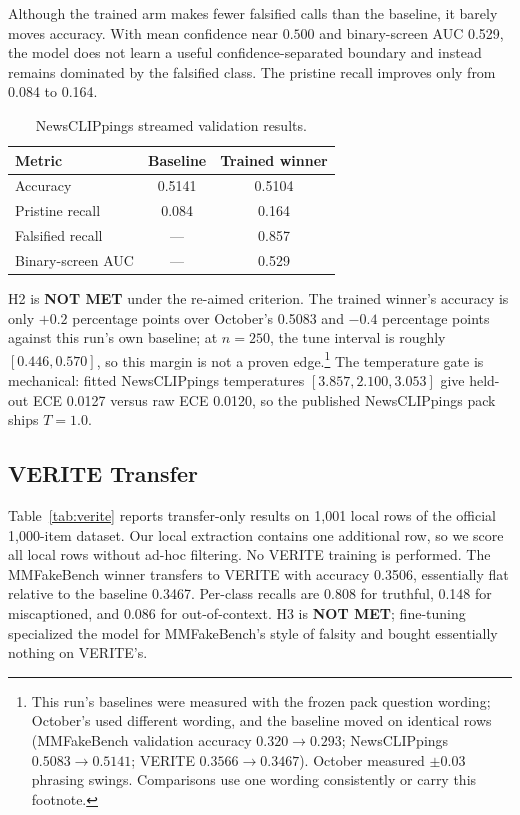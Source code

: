 \documentclass{article} %
\begin{document}
Although the trained arm makes fewer falsified calls than the baseline, it barely moves accuracy. With mean confidence near \(0.500\) and binary-screen AUC 0.529, the model does not learn a useful confidence-separated boundary and instead remains dominated by the falsified class. The pristine recall improves only from 0.084 to 0.164.

\begin{table}[t]
\centering
\small
\caption{NewsCLIPpings streamed validation results.}
\label{tab:ncp}
\begin{tabular}{lcc}
\toprule
Metric & Baseline & Trained winner \\
\midrule
Accuracy & 0.5141 & 0.5104 \\
Pristine recall & 0.084 & 0.164 \\
Falsified recall & --- & 0.857 \\
Binary-screen AUC & --- & 0.529 \\
\bottomrule
\end{tabular}
\end{table}

H2 is \textbf{NOT MET} under the re-aimed criterion. The trained winner's accuracy is only \(+0.2\) percentage points over October's 0.5083 and \(-0.4\) percentage points against this run's own baseline; at \(n=250\), the tune interval is roughly \([0.446, 0.570]\), so this margin is not a proven edge.\footnote{This run's baselines were measured with the frozen pack question wording; October's used different wording, and the baseline moved on identical rows (MMFakeBench validation accuracy \(0.320\rightarrow0.293\); NewsCLIPpings \(0.5083\rightarrow0.5141\); VERITE \(0.3566\rightarrow0.3467\)). October measured \(\pm0.03\) phrasing swings. Comparisons use one wording consistently or carry this footnote.} The temperature gate is mechanical: fitted NewsCLIPpings temperatures \([3.857, 2.100, 3.053]\) give held-out ECE 0.0127 versus raw ECE 0.0120, so the published NewsCLIPpings pack ships \(T=1.0\).

\subsection{VERITE Transfer}
Table~\ref{tab:verite} reports transfer-only results on 1,001 local rows of the official 1,000-item dataset. Our local extraction contains one additional row, so we score all local rows without ad-hoc filtering. No VERITE training is performed. The MMFakeBench winner transfers to VERITE with accuracy 0.3506, essentially flat relative to the baseline 0.3467. Per-class recalls are 0.808 for truthful, 0.148 for miscaptioned, and 0.086 for out-of-context. H3 is \textbf{NOT MET}; fine-tuning specialized the model for MMFakeBench's style of falsity and bought essentially nothing on VERITE's.
\end{document}
